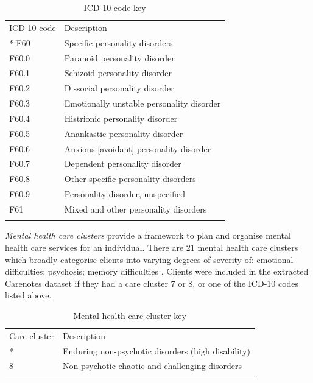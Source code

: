 \documentclass{article}
\begin{document}
\begin{table}[h]
	\centering
	\caption{ICD-10 code key}
	\begin{tabular}{
			p{}%
			p{}%
		}
		\toprule
		ICD-10 code & Description
		\tabularnewline*
		\midrule
		F60 & Specific personality disorders\\
		F60.0 & Paranoid personality disorder\\
		F60.1 & Schizoid personality disorder\\
		F60.2 & Dissocial personality disorder\\
		F60.3 & Emotionally unstable personality disorder\\
		F60.4 & Histrionic personality disorder\\
		F60.5 & Anankastic personality disorder\\
		F60.6 & Anxious [avoidant] personality disorder\\
		F60.7 & Dependent personality disorder\\
		F60.8 & Other specific personality disorders\\
		F60.9 & Personality disorder, unspecified\\
		F61 & Mixed and other personality disorders\\
		\bottomrule
		\label{tab:icd10}
	\end{tabular}
\end{table}

\textit{Mental health care clusters} provide a framework to plan and organise mental health care services for an individual. There are 21 mental health care clusters which broadly categorise clients into varying degrees of severity of: emotional difficulties; psychosis; memory difficulties \cite{NHSEnglandandNHSImprovement2019}. Clients were included in the extracted Carenotes dataset if they had a care cluster 7 or 8, or one of the ICD-10 codes listed above.  

\begin{table}[h]
	\centering
	\caption{Mental health care cluster key}
	\begin{tabular}{
			p{}%
			p{}%
		}
		\toprule
		Care cluster & Description
		\tabularnewline*
		\midrule
		7 & Enduring non-psychotic disorders (high disability)\\
		8 & Non-psychotic chaotic and challenging disorders\\
		\bottomrule
		\label{tab:icd10}
	\end{tabular}
\end{table}
\end{document}
